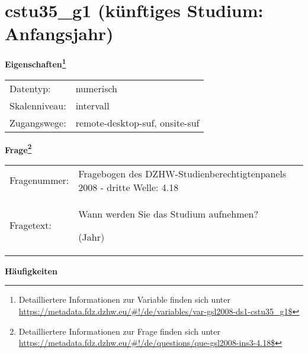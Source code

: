 
    \setcounter{footnote}{0}

    \vspace*{-1.8cm}
	\section{cstu35\_g1 (künftiges Studium: Anfangsjahr)}
	\label{section:cstu35_g1}



    \vspace*{0.5cm}
    \noindent\textbf{Eigenschaften\footnote{Detailliertere Informationen zur Variable finden sich unter
		\url{https://metadata.fdz.dzhw.eu/\#!/de/variables/var-gsl2008-ds1-cstu35_g1$}}}\\
	\begin{tabularx}{\hsize}{@{}lX}
	Datentyp: & numerisch \\
	Skalenniveau: & intervall \\
	Zugangswege: &
	  remote-desktop-suf, 
	  onsite-suf
 \\
    \end{tabularx}



				\vspace*{0.5cm}
                \noindent\textbf{Frage\footnote{Detailliertere Informationen zur Frage finden sich unter
		              \url{https://metadata.fdz.dzhw.eu/\#!/de/questions/que-gsl2008-ins3-4.18$}}}\\
				\begin{tabularx}{\hsize}{@{}lX}
					Fragenummer: &
					  Fragebogen des DZHW-Studienberechtigtenpanels 2008 - dritte Welle:
					  4.18
 \\
					Fragetext: & Wann werden Sie das Studium aufnehmen?\par  (Jahr) \\
				\end{tabularx}





        		\vspace*{0.5cm}
                \noindent\textbf{Häufigkeiten}

